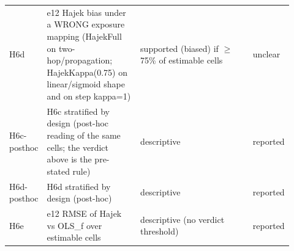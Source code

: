 \begin{longtable}{@{}p{0.11\linewidth}p{0.33\linewidth}p{0.4\linewidth}p{0.08\linewidth}@{}}
H6d & e12 Hajek bias under a WRONG exposure mapping (HajekFull on two-hop/propagation; HajekKappa(0.75) on linear/sigmoid shape and on step kappa=1) & supported (biased) if $\ge$ 75\% of estimable cells & unclear \\
H6c-posthoc & H6c stratified by design (post-hoc reading of the same cells; the verdict above is the pre-stated rule) & descriptive & reported \\
H6d-posthoc & H6d stratified by design (post-hoc) & descriptive & reported \\
H6e & e12 RMSE of Hajek vs OLS\_f over estimable cells & descriptive (no verdict threshold) & reported \\
\bottomrule
\end{longtable}
